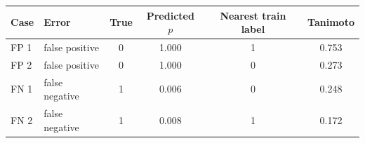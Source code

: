 \begin{tabular}{llcccc}
\toprule
Case & Error & True & Predicted $p$ & Nearest train label & Tanimoto \\
\midrule
FP 1 & false positive & 0 & 1.000 & 1 & 0.753 \\
FP 2 & false positive & 0 & 1.000 & 0 & 0.273 \\
FN 1 & false negative & 1 & 0.006 & 0 & 0.248 \\
FN 2 & false negative & 1 & 0.008 & 1 & 0.172 \\
\bottomrule
\end{tabular}
